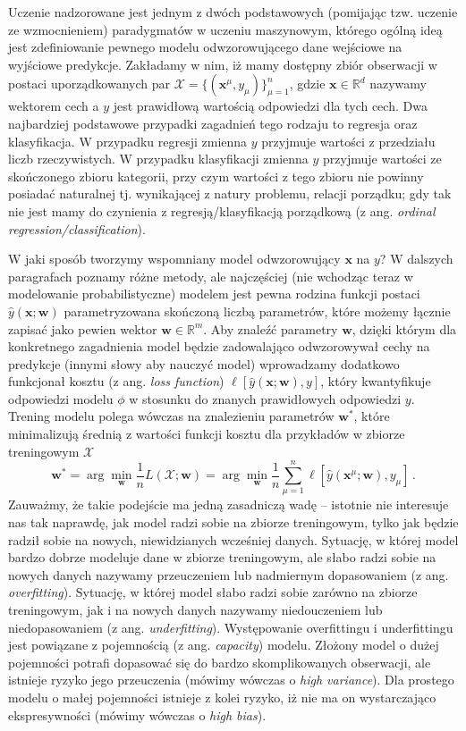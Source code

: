 \documentclass{myclass}
\numberwithin{equation}{section}
\begin{document}
Uczenie nadzorowane jest jednym z dwóch podstawowych (pomijając tzw. uczenie ze wzmocnieniem)
paradygmatów w uczeniu maszynowym, którego ogólną ideą jest zdefiniowanie pewnego modelu
odwzorowującego dane wejściowe na wyjściowe predykcje. Zakładamy w nim, iż mamy dostępny zbiór
obserwacji w postaci uporządkowanych par \(\mathcal{X} = \{(\mathbf{x}^\mu, y_\mu)\}_{\mu=1}^n\),
gdzie \(\mathbf{x} \in \mathbb{R}^d\) nazywamy wektorem cech a \(y\) jest prawidłową wartością
odpowiedzi dla tych cech. Dwa najbardziej podstawowe przypadki zagadnień tego rodzaju to regresja
oraz klasyfikacja. W przypadku regresji zmienna \(y\) przyjmuje wartości z przedziału liczb
rzeczywistych. W przypadku klasyfikacji zmienna \(y\) przyjmuje wartości ze skończonego zbioru
kategorii, przy czym wartości z tego zbioru nie powinny posiadać naturalnej tj. wynikającej z natury
problemu, relacji porządku; gdy tak nie jest mamy do czynienia z regresją/klasyfikacją porządkową (z
ang. \textit{ordinal regression/classification}).

W jaki sposób tworzymy wspomniany model odwzorowujący \(\mathbf{x}\) na \(y\)? W dalszych
paragrafach poznamy różne metody, ale najczęściej (nie wchodząc teraz w modelowanie
probabilistyczne) modelem jest pewna rodzina funkcji postaci \(\hat{y}(\mathbf{x}; \mathbf{w})\)
parametryzowana skończoną liczbą parametrów, które możemy łącznie zapisać jako pewien wektor
\(\mathbf{w} \in \mathbb{R}^m\). Aby znaleźć parametry \(\mathbf{w}\), dzięki którym dla konkretnego
zagadnienia model będzie zadowalająco odwzorowywał cechy na predykcje (innymi słowy aby nauczyć
model) wprowadzamy dodatkowo funkcjonał kosztu (z ang. \textit{loss function})
\(\ell[\hat{y}(\mathbf{x};\mathbf{w}), y]\), który kwantyfikuje odpowiedzi modelu \(\phi\) w
stosunku do znanych prawidłowych odpowiedzi \(y\). Trening modelu polega wówczas na znalezieniu
parametrów \(\mathbf{w}^*\), które minimalizują średnią z wartości funkcji kosztu dla przykładów w
zbiorze treningowym \(\mathcal{X}\)
\begin{equation}
    \mathbf{w}^* = \arg\min_{\mathbf{w}} \frac{1}{n}L(\mathcal{X};\mathbf{w}) = \arg\min_{\mathbf{w}} \frac{1}{n}\sum_{\mu=1}^n \ell[\hat{y}(\mathbf{x}^\mu;\mathbf{w}), y_\mu]\,.
\end{equation}
Zauważmy, że takie podejście ma jedną zasadniczą wadę -- istotnie nie interesuje nas tak naprawdę,
jak model radzi sobie na zbiorze treningowym, tylko jak będzie radził sobie na nowych, niewidzianych
wcześniej danych. Sytuację, w której model bardzo dobrze modeluje dane w zbiorze treningowym, ale
słabo radzi sobie na nowych danych nazywamy przeuczeniem lub nadmiernym dopasowaniem (z ang.
\textit{overfitting}). Sytuację, w której model słabo radzi sobie zarówno na zbiorze treningowym,
jak i na nowych danych nazywamy niedouczeniem lub niedopasowaniem (z ang. \textit{underfitting}).
Występowanie overfittingu i underfittingu jest powiązane z pojemnością (z ang. \textit{capacity})
modelu. Złożony model o dużej pojemności potrafi dopasować się do bardzo skomplikowanych obserwacji,
ale istnieje ryzyko jego przeuczenia (mówimy wówczas o \textit{high variance}). Dla prostego modelu
o małej pojemności istnieje z kolei ryzyko, iż nie ma on wystarczająco ekspresywności (mówimy
wówczas o \textit{high bias}).
 
\end{document}
